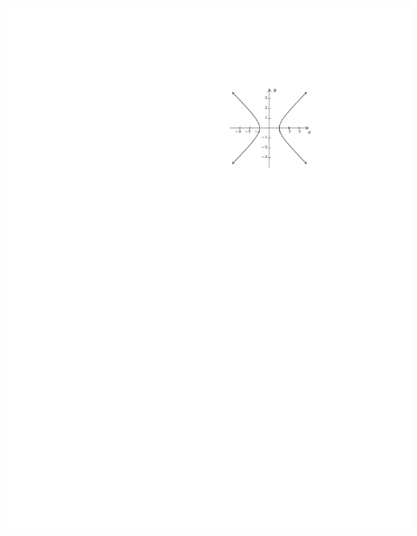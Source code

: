 \documentclass{ximera}
\begin{document}
\begin{exercise}
\begin{selectAll}
{\begin{image}
\end{image}
}\choice
{
\begin{image}
\includegraphics{WiaFgraphs1-4.pdf}
\end{image}
}\choice
{
\begin{image}

\end{image}}
\end{selectAll}
\end{exercise}
\end{document}
